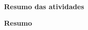 {\large\textbf{Resumo das atividades}}      %

{\large\textbf{Resumo}}                     %

\clearpage                                  %

\listoffigures                              %

\clearpage                                  %

\listoftables                               %

\clearpage                                  %






\clearpage                                  %